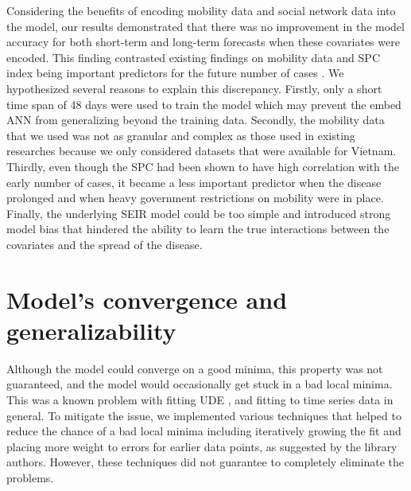 Considering the benefits of encoding mobility data and social network data into the model, our results demonstrated that there was no improvement in the model accuracy for both short-term and long-term forecasts when these covariates were encoded.
This finding contrasted existing findings on mobility data and \gls{SPC} index being important predictors for the future number of cases \cite{changMobilityNetworkModels2021,kuchlerGeographicSpreadCOVID192020,arikInterpretableSequenceLearning,liSubstantialUndocumentedInfection2020}.
We hypothesized several reasons to explain this discrepancy.
Firstly, only a short time span of 48 days were used to train the model which may prevent the embed \gls{ANN} from generalizing beyond the training data.
Secondly, the mobility data that we used was not as granular and complex as those used in existing researches because we only considered datasets that were available for Vietnam.
Thirdly, even though the \gls{SPC} had been shown to have high correlation with the early number of cases, it became a less important predictor when the disease prolonged and when heavy government restrictions on mobility were in place.
Finally, the underlying \gls{SEIR} model could be too simple and introduced strong model bias that hindered the ability to learn the true interactions between the covariates and the spread of the disease.

\section{Model's convergence and generalizability}

Although the model could converge on a good minima, this property was not guaranteed, and the model would occasionally get stuck in a bad local minima.
This was a known problem with fitting \gls{UDE} \cite{rackauckasUniversalDifferentialEquations2020}, and fitting to time series data in general.
To mitigate the issue, we implemented various techniques that helped to reduce the chance of a bad local minima including iteratively growing the fit and placing more weight to errors for earlier data points, as suggested by the library authors.
However, these techniques did not guarantee to completely eliminate the problems.

